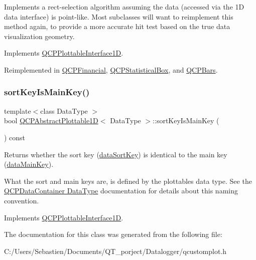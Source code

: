 Implements a rect-\/selection algorithm assuming the data (accessed via the 1D data interface) is point-\/like. Most subclasses will want to reimplement this method again, to provide a more accurate hit test based on the true data visualization geometry.

Implements \hyperlink{class_q_c_p_plottable_interface1_d_a67093e4ccf490ff5f7750640941ff34c}{Q\+C\+P\+Plottable\+Interface1D}.



Reimplemented in \hyperlink{class_q_c_p_financial_a3c5beb1ab028a1dba845fc9dcffc7cf4}{Q\+C\+P\+Financial}, \hyperlink{class_q_c_p_statistical_box_a42febad6ad5e924a151434cc434b4ffc}{Q\+C\+P\+Statistical\+Box}, and \hyperlink{class_q_c_p_bars_ab03bb6125c3e983b89d694f75ce6b3d5}{Q\+C\+P\+Bars}.

\mbox{\label{class_q_c_p_abstract_plottable1_d_a022e8905f5a667d8379493d6a037e79f}} 
\subsubsection{\texorpdfstring{sort\+Key\+Is\+Main\+Key()}{sortKeyIsMainKey()}}
{\footnotesize\ttfamily template$<$class Data\+Type $>$ \\
bool \hyperlink{class_q_c_p_abstract_plottable1_d}{Q\+C\+P\+Abstract\+Plottable1D}$<$ Data\+Type $>$\+::sort\+Key\+Is\+Main\+Key (\begin{DoxyParamCaption}{ }\end{DoxyParamCaption}) const\hspace{0.3cm}{\ttfamily [virtual]}}





Returns whether the sort key (\hyperlink{class_q_c_p_abstract_plottable1_d_a6fce4e684f33a31c45928899b5d9ab4b}{data\+Sort\+Key}) is identical to the main key (\hyperlink{class_q_c_p_abstract_plottable1_d_ab14ab428595856bf76e04499017fa8dc}{data\+Main\+Key}).

What the sort and main keys are, is defined by the plottable\textquotesingle{}s data type. See the \hyperlink{class_q_c_p_data_container_qcpdatacontainer-datatype}{Q\+C\+P\+Data\+Container Data\+Type} documentation for details about this naming convention. 

Implements \hyperlink{class_q_c_p_plottable_interface1_d_a229e65e7ab968dd6cd0e259fa504b79d}{Q\+C\+P\+Plottable\+Interface1D}.



The documentation for this class was generated from the following file\+:\begin{DoxyCompactItemize}
\item 
C\+:/\+Users/\+Sebastien/\+Documents/\+Q\+T\+\_\+porject/\+Datalogger/qcustomplot.\+h\end{DoxyCompactItemize}
